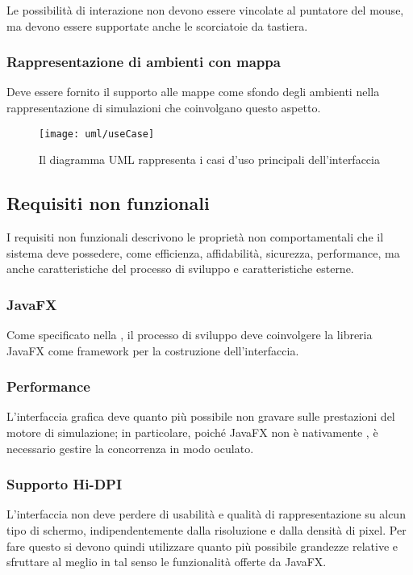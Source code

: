                 Le possibilità di interazione non devono essere vincolate al puntatore del mouse, ma devono essere supportate anche le scorciatoie da tastiera.

            \subsubsection{Rappresentazione di ambienti con mappa}\label{subsubsec:mappa}
                Deve essere fornito il supporto alle mappe come sfondo degli ambienti nella rappresentazione di simulazioni che coinvolgano questo aspetto.

            \begin{figure}[htbp]
                \centering
                \texttt{[image: uml/useCase]}
                \caption{Il diagramma UML rappresenta i casi d'uso principali dell'interfaccia}
                \label{fig:useCase}
            \end{figure}

        \subsection{Requisiti non funzionali}\label{subsec:nonFunzionali}
            I requisiti non funzionali descrivono le proprietà non comportamentali che il sistema deve possedere, come efficienza, affidabilità, sicurezza, performance, ma anche caratteristiche del processo di sviluppo e caratteristiche esterne.

            \subsubsection{JavaFX}\label{subsubsec:jfx}
                Come specificato nella , il processo di sviluppo deve coinvolgere la libreria JavaFX come framework per la costruzione dell'interfaccia.

            \subsubsection{Performance}\label{subsubsec:performance}
                L'interfaccia grafica deve quanto più possibile non gravare sulle prestazioni del motore di simulazione;
                in particolare, poiché JavaFX non è nativamente , è necessario gestire la concorrenza in modo oculato.

            \subsubsection{Supporto Hi-DPI}\label{subsubsec:hidpi}
                L'interfaccia non deve perdere di usabilità e qualità di rappresentazione su alcun tipo di schermo, indipendentemente dalla risoluzione e dalla densità di pixel.
                Per fare questo si devono quindi utilizzare quanto più possibile grandezze relative e sfruttare al meglio in tal senso le funzionalità offerte da JavaFX.

